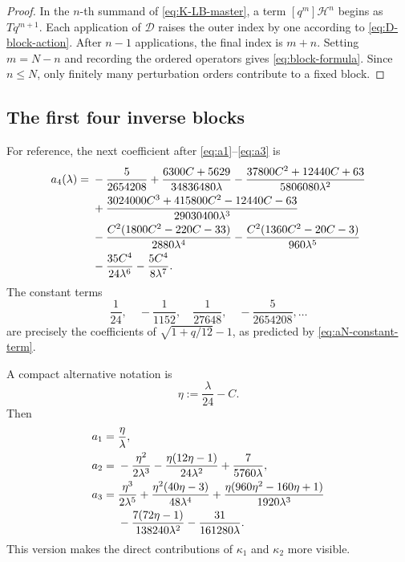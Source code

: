 \documentclass[11pt,oneside]{article}
\theoremstyle{plain}
\theoremstyle{definition}
\theoremstyle{remark}
\newcommand{\Hcal}{\mathcal{H}}
\begin{document}
\begin{proof}
In the \(n\)-th summand of \cref{eq:K-LB-master}, a term
\([q^m]\Hcal^n\) begins as \(Tq^{m+1}\).  Each application of
\(\mathscr D\) raises the outer index by one according to
\cref{eq:D-block-action}.  After \(n-1\) applications, the final index is
\(m+n\).  Setting \(m=N-n\) and recording the ordered operators gives
\cref{eq:block-formula}.  Since \(n\le N\), only finitely many perturbation
orders contribute to a fixed block.
\end{proof}

\subsection{The first four inverse blocks}

For reference, the next coefficient after \cref{eq:a1}--\cref{eq:a3} is
\begin{align}
 a_4(\lambda)={}&-\frac5{2654208}
 +\frac{6300C+5629}{34836480\lambda}
 -\frac{37800C^2+12440C+63}{5806080\lambda^2}
 \notag\\
 &+\frac{3024000C^3+415800C^2-12440C-63}
        {29030400\lambda^3}
 \notag\\
 &-\frac{C^2(1800C^2-220C-33)}{2880\lambda^4}
 -\frac{C^2(1360C^2-20C-3)}{960\lambda^5}
 \notag\\
 &-\frac{35C^4}{24\lambda^6}
 -\frac{5C^4}{8\lambda^7}.
 \label{eq:a4}
\end{align}
The constant terms
\begin{equation}
 \frac1{24},\quad -\frac1{1152},\quad
 \frac1{27648},\quad -\frac5{2654208},\ldots
 \label{eq:constant-blocks}
\end{equation}
are precisely the coefficients of
\(\sqrt{1+q/12}-1\), as predicted by
\cref{eq:aN-constant-term}.

A compact alternative notation is
\begin{equation}
 \eta:=\frac{\lambda}{24}-C.
 \label{eq:eta-def}
\end{equation}
Then
\begin{align}
 a_1={}&\frac{\eta}{\lambda},
 \label{eq:a1-eta}\\
 a_2={}&-\frac{\eta^2}{2\lambda^3}
 -\frac{\eta(12\eta-1)}{24\lambda^2}
 +\frac7{5760\lambda},
 \label{eq:a2-eta}\\
 a_3={}&\frac{\eta^3}{2\lambda^5}
 +\frac{\eta^2(40\eta-3)}{48\lambda^4}
 +\frac{\eta(960\eta^2-160\eta+1)}{1920\lambda^3}
 \notag\\
 &-\frac{7(72\eta-1)}{138240\lambda^2}
 -\frac{31}{161280\lambda}.
 \label{eq:a3-eta}
\end{align}
This version makes the direct contributions of \(\kappa_1\) and
\(\kappa_2\) more visible.
\end{document}
